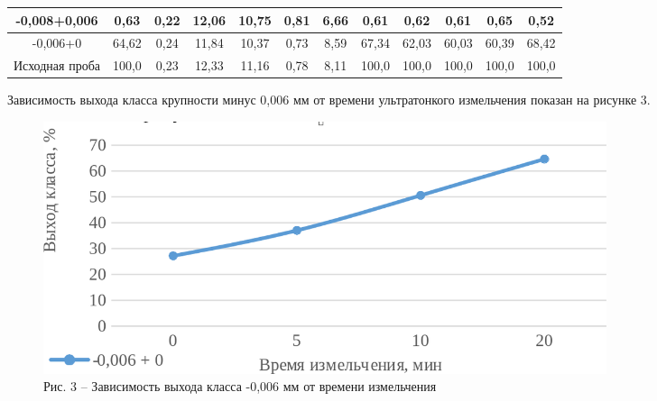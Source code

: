 {\begin{longtable}[c]{|p{}ccccccccccc|}
\multicolumn{1}{|c|}{-0,008+0,006} & \multicolumn{1}{c|}{0,63} & \multicolumn{1}{c|}{0,22} & \multicolumn{1}{c|}{12,06} & \multicolumn{1}{c|}{10,75} & \multicolumn{1}{c|}{0,81} & \multicolumn{1}{c|}{6,66} & \multicolumn{1}{c|}{0,61} & \multicolumn{1}{c|}{0,62} & \multicolumn{1}{c|}{0,61} & \multicolumn{1}{c|}{0,65} & 0,52 \\ \hline
\multicolumn{1}{|c|}{-0,006+0} & \multicolumn{1}{c|}{64,62} & \multicolumn{1}{c|}{0,24} & \multicolumn{1}{c|}{11,84} & \multicolumn{1}{c|}{10,37} & \multicolumn{1}{c|}{0,73} & \multicolumn{1}{c|}{8,59} & \multicolumn{1}{c|}{67,34} & \multicolumn{1}{c|}{62,03} & \multicolumn{1}{c|}{60,03} & \multicolumn{1}{c|}{60,39} & 68,42 \\ \hline
\multicolumn{1}{|c|}{Исходная проба} & \multicolumn{1}{c|}{100,0} & \multicolumn{1}{c|}{0,23} & \multicolumn{1}{c|}{12,33} & \multicolumn{1}{c|}{11,16} & \multicolumn{1}{c|}{0,78} & \multicolumn{1}{c|}{8,11} & \multicolumn{1}{c|}{100,0} & \multicolumn{1}{c|}{100,0} & \multicolumn{1}{c|}{100,0} & \multicolumn{1}{c|}{100,0} & 100,0\\ \hline
\end{longtable}}

Зависимость выхода класса крупности минус 0,006 мм от времени
ультратонкого измельчения показан на рисунке 3.

\begin{figure}[H]
	\centering
	\includegraphics[width=0.8\textwidth]{assets/300.1}
	\caption*{Рис. 3 -- Зависимость выхода класса -0,006 мм от времени измельчения}
\end{figure}

